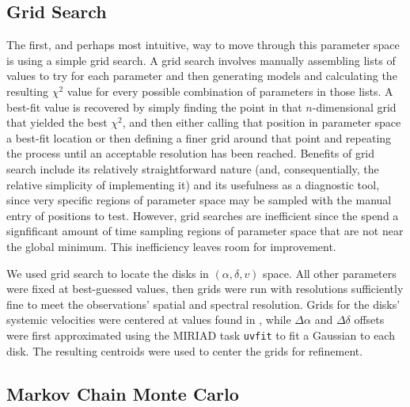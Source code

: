 \subsection{Grid Search}
\label{subsection:grid_search}
The first, and perhaps most intuitive, way to move through this parameter space is using a simple grid search. A grid search involves manually assembling lists of values to try for each parameter and then generating models and calculating the resulting $\chi^2$ value for every possible combination of parameters in those lists. A best-fit value is recovered by simply finding the point in that $n$-dimensional grid that yielded the best $\chi^2$, and then either calling that position in parameter space a best-fit location or then defining a finer grid around that point and repeating the process until an acceptable resolution has been reached. Benefits of grid search include its relatively straightforward nature (and, consequentially, the relative simplicity of implementing it) and its usefulness as a diagnostic tool, since very specific regions of parameter space may be sampled with the manual entry of positions to test. However, grid searches are inefficient since the spend a signfificant amount of time sampling regions of parameter space that are not near the global minimum. This inefficiency leaves room for improvement.


We used grid search to locate the disks in $(\alpha, \delta, v)$ space. All other parameters were fixed at best-guessed values, then grids were run with resolutions sufficiently fine to meet the observations' spatial and spectral resolution. Grids for the disks' systemic velocities were centered at values found in \citet{Williams2014}, while $\Delta \alpha$ and $\Delta \delta$ offsets were first approximated using the MIRIAD task \texttt{uvfit} to fit a Gaussian to each disk. The resulting centroids were used to center the grids for refinement.


\subsection{Markov Chain Monte Carlo}
\label{subsection:mcmc}

